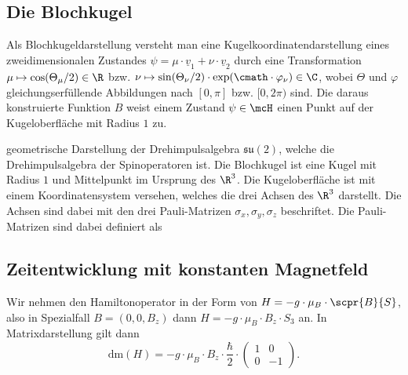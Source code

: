 \documentclass{subfiles}
\begin{document}
    \subsection{Die Blochkugel} 
        Als Blochkugeldarstellung versteht man eine Kugelkoordinatendarstellung eines zweidimensionalen Zustandes $\psi = \mu\cdot\underline v_1 + \nu\cdot\underline v_2$ durch eine Transformation $\mu \mapsto \cos(\Theta_\mu/2)\in\R$ bzw. $\nu \mapsto \sin(\Theta_\nu/2)\cdot \exp(\cmath\cdot\varphi_\nu)\in\C$, wobei $\Theta$ und $\varphi$ gleichungserfüllende Abbildungen nach $[0,\pi]$ bzw. $[0,2\pi)$ sind. Die daraus konstruierte Funktion $B$ weist einem Zustand $\psi\in\mcH$ einen Punkt auf der Kugeloberfläche mit Radius $1$ zu.  
        
        geometrische Darstellung der Drehimpulsalgebra $\mathfrak{su}(2)$, welche die Drehimpulsalgebra der Spinoperatoren ist. Die Blochkugel ist eine Kugel mit Radius $1$ und Mittelpunkt im Ursprung des $\R^3$. Die Kugeloberfläche ist mit einem Koordinatensystem versehen, welches die drei Achsen des $\R^3$ darstellt. Die Achsen sind dabei mit den drei Pauli-Matrizen $\sigma_x, \sigma_y, \sigma_z$ beschriftet. Die Pauli-Matrizen sind dabei definiert als

    \subsection{Zeitentwicklung mit konstanten Magnetfeld}
        Wir nehmen den Hamiltonoperator in der Form von $H = -g\cdot\mu_B\cdot \scpr{B}{S}$, also in Spezialfall $B = (0,0,B_z)$ dann $H = -g\cdot\mu_B\cdot B_z\cdot S_3$ an. In Matrixdarstellung gilt dann 
        \[
            \text{dm}(H) = -g\cdot\mu_B\cdot B_z\cdot \frac{\hbar}{2}\cdot\begin{pmatrix}
                1 & 0 \\
                0 & -1
            \end{pmatrix}.
        \]
        
        
\end{document}
